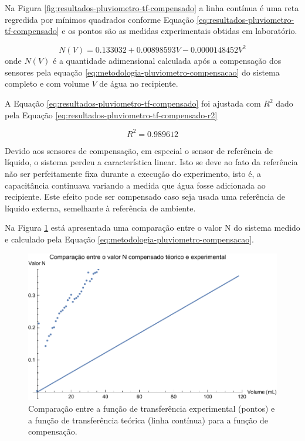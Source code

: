 \documentclass[a4paper]{instrumentacao}
\begin{document}
Na Figura \ref{fig:resultados-pluviometro-tf-compensado} a linha contínua é uma reta regredida por mínimos quadrados conforme Equação \ref{eq:resultados-pluviometro-tf-compensado} e os pontos são as medidas experimentais obtidas em laboratório.

\begin{equation}
	N(V) = 0.133032 + 0.00898593 V - 0.0000148452 V^2
	\label{eq:resultados-pluviometro-tf-compensado}
\end{equation}
\noindent onde $N(V)$ é a quantidade adimensional calculada após a compensação dos sensores pela equação \ref{eq:metodologia-pluviometro-compensacao} do sistema completo e com volume $V$ de água no recipiente.

A Equação \ref{eq:resultados-pluviometro-tf-compensado} foi ajustada com $R^2$ dado pela Equação \ref{eq:resultados-pluviometro-tf-compensado-r2} 

\begin{equation}
	R^2 = 0.989612
	\label{eq:resultados-pluviometro-tf-compensado-r2}
\end{equation}

Devido aos sensores de compensação, em especial o sensor de referência de líquido, o sistema perdeu a característica linear. Isto se deve ao fato da referência não ser perfeitamente fixa durante a execução do experimento, isto é, a capacitância continuava variando a medida que água fosse adicionada ao recipiente. Este efeito pode ser compensado caso seja usada uma referência de líquido externa, semelhante à referência de ambiente.

Na Figura \ref{fig:resultados-pluviometro-compensacao-comparacao} está apresentada uma comparação entre o valor N do sistema medido e calculado pela Equação \ref{eq:metodologia-pluviometro-compensacao}.

\begin{figure}[H]
	\centering \includegraphics[width=\textwidth]{Nivel/Experimental/Compensado-Comparacao.pdf}
	\caption{Comparação entre a função de transferência experimental (pontos) e a função de transferência teórica (linha contínua) para a função de compensação.}
	\label{fig:resultados-pluviometro-compensacao-comparacao}
\end{figure}
\end{document}
